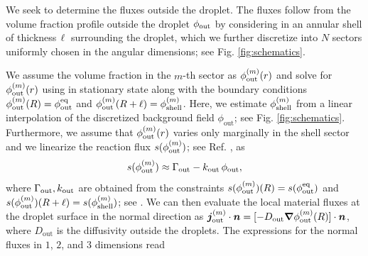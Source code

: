 \begin{appendices}
\label{sec:fluxes_inside_shell}

We seek to determine the fluxes outside the droplet. 
The fluxes follow from the volume fraction profile outside the droplet $\phi_\mathrm{out}$ by considering  in an annular shell of thickness\,$\ell$ surrounding the droplet, which we further discretize into $N$ sectors uniformly chosen in the angular dimensions; see Fig. \ref{fig:schematics}.

We assume the volume fraction in the $m$-th sector as $\phi_\mathrm{out}^{(m)}(r)$ and solve for $\phi_\mathrm{out}^{(m)}(r)$ using  in stationary state along with the boundary conditions $\phi_\mathrm{out}^{(m)}(R)=\phi^\mathrm{eq}_\mathrm{out}$ and $\phi_\mathrm{out}^{(m)}(R + \ell)= \phi_\mathrm{shell}^{(m)}$.
Here, we estimate $\phi_\mathrm{shell}^{(m)}$ from a linear interpolation of the discretized background field $\phi_\mathrm{out}$; see Fig. \ref{fig:schematics}.
Furthermore, we assume that $\phi_\mathrm{out}^{(m)}(r)$ varies only marginally in the shell sector and we linearize the reaction flux $s(\phi_\mathrm{out}^{(m)})$; see Ref. \cite{Review2019}, as 
\begin{equation*}
    s(\phi_\mathrm{out}^{(m)}) \approx \Gamma_\mathrm{out} - k_\mathrm{out}\,\phi_\mathrm{out},
\end{equation*}
where $\Gamma_\mathrm{out}, k_\mathrm{out}$
are obtained from the constraints $s(\phi_\mathrm{out}^{(m)})(R) = s(\phi^\mathrm{eq}_\mathrm{out})$ and $s(\phi_\mathrm{out}^{(m)})(R + \ell) = s(\phi_\mathrm{shell}^{(m)})$; see .
We can then evaluate the local material fluxes at the droplet surface in the normal direction as $\boldsymbol{j}_\mathrm{out}^{(m)} \cdot \boldsymbol{n} = [-D_\mathrm{out} {\boldsymbol{\nabla}} \phi_\mathrm{out}^{(m)}(R)] \cdot \boldsymbol{n} $, where $D_\mathrm{out}$ is the diffusivity outside the droplets.
The expressions for the normal fluxes in $1$, $2$, and $3$ dimensions read


\end{appendices}
